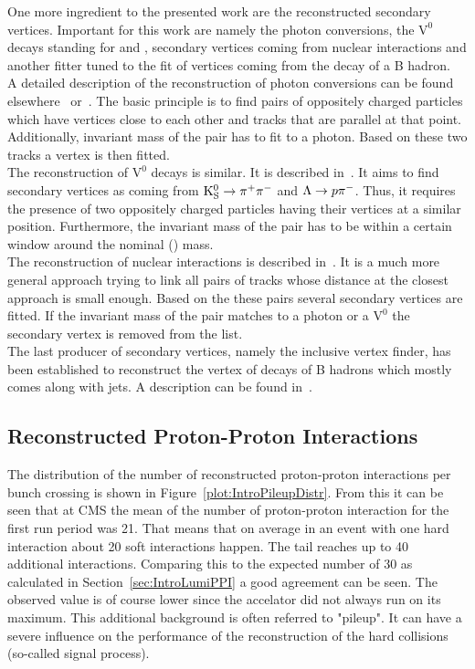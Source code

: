 One more ingredient to the presented work are the reconstructed secondary vertices. Important for this work are namely the photon conversions, the $\text{V}^{\text{0}}$ decays standing for \PKzS{} and \PgL{}, secondary vertices coming from nuclear interactions and another fitter tuned to the fit of vertices coming from the decay of a B hadron. \\
A detailed description of the reconstruction of photon conversions can be found elsewhere~\cite{GiordanoConversion} or~\cite{CMS-PAS-EGM-10-005}. The basic principle is to find pairs of oppositely charged particles which have vertices close to each other and tracks that are parallel at that point. Additionally, invariant mass of the pair has to fit to a photon. Based on these two tracks a vertex is then fitted. \\
The reconstruction of $\text{V}^{\text{0}}$ decays is similar. It is described in~. It aims to find secondary vertices as coming from $\mathrm{K}^0_\mathrm{S}{} \rightarrow{} \pi{}^{+}{}\pi{}^{-}{}$ and $\Lambda{}{} \rightarrow{} p\pi{}^{-}{}$. Thus, it requires the presence of two oppositely charged particles having their vertices at a similar position. Furthermore, the invariant mass of the pair has to be within a certain window around the nominal \PKzS{} (\PgL{}) mass. \\
The reconstruction of nuclear interactions is described in~. It is a much more general approach trying to link all pairs of tracks whose distance at the closest approach is small enough. Based on the these pairs several secondary vertices are fitted. If the invariant mass of the pair matches to a photon or a $\text{V}^{\text{0}}$ the secondary vertex is removed from the list. \\
The last producer of secondary vertices, namely the inclusive vertex finder, has been established to reconstruct the vertex of decays of B hadrons which mostly comes along with jets. A description can be found in~.


\subsection{Reconstructed Proton-Proton Interactions}

The distribution of the number of reconstructed proton-proton interactions per bunch crossing is shown in Figure~\ref{plot:IntroPileupDistr}. From this it can be seen that at CMS the mean of the number of proton-proton interaction for the first run period was 21. That means that on average in an event with one hard interaction about 20 soft interactions happen. The tail reaches up to 40 additional interactions. Comparing this to the expected number of 30 as calculated in Section~\ref{sec:IntroLumiPPI} a good agreement can be seen. The observed value is of course lower since the accelator did not always run on its maximum. This additional background is often referred to "pileup". It can have a severe influence on the performance of the reconstruction of the hard collisions (so-called signal process).

